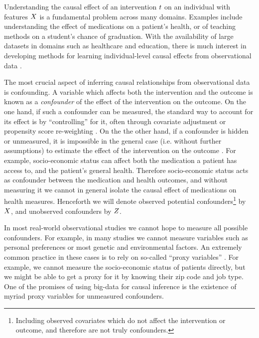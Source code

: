 Understanding the causal effect of an intervention $\*t$ on an individual with features $\*X$ is a fundamental problem across many domains. Examples include understanding the effect of medications on a patient's health, or of teaching methods on a student's chance of graduation. With the availability of large datasets in domains such as healthcare and education, there is much interest in developing methods for learning individual-level causal effects from observational data \citep{pearl2015detecting,wager2015estimation,johansson2016learning,peysakhovich2016combining}. 


The most crucial aspect of inferring causal relationships from observational data is confounding. A variable which affects both the intervention and the outcome is known as a \emph{confounder} of the effect of the intervention on the outcome. On the one hand, if such a confounder can be measured, the standard way to account for its effect is by ``controlling'' for it, often through covariate adjustment or propensity score re-weighting \citep{morgan2014counterfactuals}. On the the other hand, if a confounder is hidden or unmeasured, it is impossible in the general case (i.e. without further assumptions) to estimate the effect of the intervention on the outcome \citep{pearl2009causality}. For example, socio-economic status can affect both the medication a patient has access to, and the patient's general health. Therefore socio-economic status acts as confounder between the medication and health outcomes, and without measuring it we cannot in general isolate the causal effect of medications on health measures. Henceforth we will denote observed potential confounders\footnote{Including observed covariates which do not affect the intervention or outcome, and therefore are not truly confounders.} by $\*X$, and unobserved confounders by $\*Z$. 


In most real-world observational studies we cannot hope to measure all possible confounders. For example, in many studies we cannot measure variables such as personal preferences or most genetic and environmental factors. An extremely common practice in these cases is to rely on so-called ``proxy variables'' \cite[Ch. 11]{montgomery2000measuring,angrist2008mostly,maddala1992introduction}. For example, we cannot measure the socio-economic status of patients directly, but we might be able to get a proxy for it by knowing their zip code and job type. One of the promises of using big-data for causal inference is the existence of myriad proxy variables for unmeasured confounders. 

